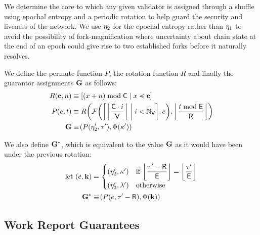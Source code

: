 We determine the core to which any given validator is assigned through a shuffle using epochal entropy and a periodic rotation to help guard the security and liveness of the network. We use $\eta_2$ for the epochal entropy rather than $\eta_1$ to avoid the possibility of fork-magnification where uncertainty about chain state at the end of an epoch could give rise to two established forks before it naturally resolves.

We define the permute function $P$, the rotation function $R$ and finally the guarantor assignments  $\mathbf{G}$ as follows:
\begin{align}
  R(\mathbf{c}, n) &\equiv \sq{\build{(x + n) \bmod \corecount}{x \orderedin \mathbf{c}}}\\
  P(e, t) &\equiv R\left(
    \Ffyshuffle{\sq{\build{\ffrac{\corecount \cdot i}{\valcount}}{i \orderedin \valindex}}, e},
    \ffrac{t \bmod \epochlen}{\mathsf{R}}
  \right)\\
  \guarantorassignments &\equiv \tup{P(\entropy'_2, \thetime'), \Phi(\activeset')}
\end{align}

We also define $\mathbf{G}^*$, which is equivalent to the value $\mathbf{G}$ as it would have been under the previous rotation:
\begin{equation}
  \label{eq:priorassignments}
  \begin{aligned}
    \using (e, \mathbf{k}) &= \begin{cases}
      (\entropy'_2, \activeset') &\when \displaystyle\ffrac{\thetime' - \mathsf{R}}{\epochlen} = \ffrac{\thetime'}{\epochlen}\\
      (\entropy'_3, \previousset') &\otherwise
    \end{cases} \\
    \guarantorassignmentsunderlastrotation &\equiv \tup{
      P(e, \thetime' - \mathsf{R}),
      \Phi(\mathbf{k})
    }
  \end{aligned}
\end{equation}














\subsection{Work Report Guarantees}\label{sec:workreportguarantees}


